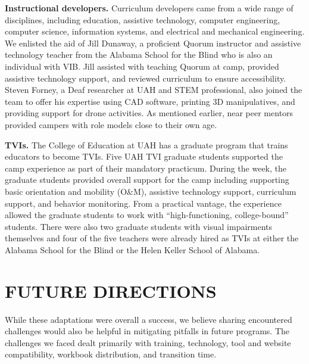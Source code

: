 \documentclass[11.5pt]{sig-alternate} %
\begin{document}
\begin{large}
\textbf{Instructional developers.} Curriculum developers came from a wide range of disciplines, including education, assistive technology, computer engineering, computer science, information systems, and electrical and mechanical engineering. We enlisted the aid of Jill Dunaway, a proficient Quorum instructor and assistive technology teacher from the Alabama School for the Blind who is also an individual with VIB. Jill assisted with teaching Quorum at camp, provided assistive technology support, and reviewed curriculum to ensure accessibility. Steven Forney, a Deaf researcher at UAH and STEM professional, also joined the team to offer his expertise using CAD software, printing 3D manipulatives, and providing support for drone activities. As mentioned earlier, near peer mentors provided campers with role models close to their own age. 

\textbf{TVIs.} The College of Education at UAH has a graduate program that trains educators to become TVIs. Five UAH TVI graduate students supported the camp experience as part of their mandatory practicum. During the week, the graduate students provided overall support for the camp including supporting basic orientation and mobility (O\&M), assistive technology support, curriculum support, and behavior monitoring. From a practical vantage, the experience allowed the graduate students to work with “high-functioning, college-bound” students. There were also two graduate students with visual impairments themselves and four of the five teachers were already hired as TVIs at either the Alabama School for the Blind or the Helen Keller School of Alabama. 

\section*{FUTURE DIRECTIONS}

While these adaptations were overall a success, we believe sharing encountered challenges would also be helpful in mitigating pitfalls in future programs. The challenges we faced dealt primarily with training, technology, tool and website compatibility, workbook distribution, and transition time. 


\end{large}
\end{document}
